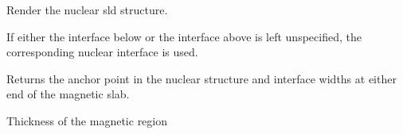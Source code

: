 \documentclass[letterpaper,10pt,english]{sphinxmanual}
\begin{document}
\begin{fulllineitems}

\begin{fulllineitems}
\label{api/magnetic:refl1d.magnetic.FreeMagnetic.render_stack}
Render the nuclear sld structure.

If either the interface below or the interface above is left
unspecified, the corresponding nuclear interface is used.

Returns the anchor point in the nuclear structure and interface
widths at either end of the magnetic slab.

\end{fulllineitems}


\begin{fulllineitems}
\label{api/magnetic:refl1d.magnetic.FreeMagnetic.thickness}
Thickness of the magnetic region

\end{fulllineitems}


\begin{fulllineitems}
\label{api/magnetic:refl1d.magnetic.FreeMagnetic.thicknessM}
\end{fulllineitems}


\end{fulllineitems}

\end{document}
